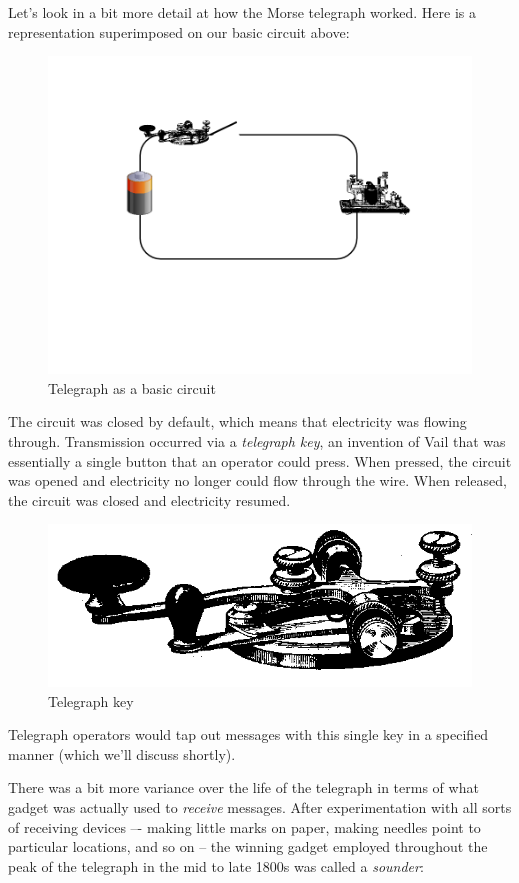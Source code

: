 \documentclass[UTF8]{book}
\begin{document}
\begin{CJK}{UTF8}{gbsn}
Let's look in a bit more detail at how the Morse telegraph worked. Here is a representation superimposed on our basic circuit above:

\begin{figure}[H]
\centering
\includegraphics[width=0.8\linewidth]{telegraph_as_circuit}
\caption{Telegraph as a basic circuit}
\end{figure}

The circuit was closed by default, which means that electricity was flowing through. Transmission occurred via a \emph{telegraph key}, an invention of Vail that was essentially a single button that an operator could press. When pressed, the circuit was opened and electricity no longer could flow through the wire. When released, the circuit was closed and electricity resumed.

\begin{figure}[H]
\centering
\includegraphics[width=0.6\linewidth]{telegraphkey}
\caption{Telegraph key}
\end{figure}

Telegraph operators would tap out messages with this single key in a specified manner (which we'll discuss shortly).

There was a bit more variance over the life of the telegraph in terms of what gadget was actually used to \emph{receive} messages. After experimentation with all sorts of receiving devices –- making little marks on paper, making needles point to particular locations, and so on -- the winning gadget employed throughout the peak of the telegraph in the mid to late 1800s was called a \emph{sounder}:


\end{CJK}
\end{document}
